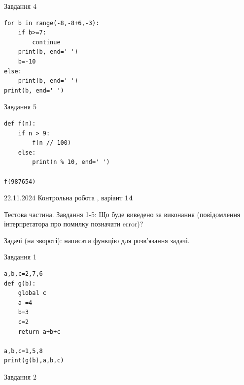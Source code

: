 \documentclass[12pt, ukrainian]{article}
\begin{document}
{{{{{{{{{{{{{\begin{minipage}[t]{10.7cm}
{\begin{center}Завдання {4}\end{center}}
\vspace{-6mm}

\begin{verbatim}
for b in range(-8,-8+6,-3):
    if b>=7:
        continue
    print(b, end=' ')
    b=-10
else:
    print(b, end=' ')
print(b, end=' ')
\end{verbatim}


\vspace{5mm}
               
{\begin{center}Завдання {5}\end{center}}
\vspace{-6mm}

\begin{verbatim}
def f(n):
    if n > 9:
        f(n // 100)
    else:
        print(n % 10, end=' ')

f(987654)
\end{verbatim}


\end{minipage}

\newpage

{{22.11.2024 Контрольна робота , варіант  \No \textbf { 14 }\par}}
{

Тестова частина. Завдання 1-5: Що буде виведено за виконання (повідомлення інтерпретатора про помилку позначати error)?

Задачі (на звороті): написати функцію для розв'язання задачі.

\vspace{5mm} \begin{minipage}[t]{8.5cm}
               
{\begin{center}Завдання {1}\end{center}}
\vspace{-6mm}

\begin{verbatim}
a,b,c=2,7,6
def g(b):
    global c
    a-=4
    b=3
    c=2
    return a+b+c

a,b,c=1,5,8
print(g(b),a,b,c)
\end{verbatim}


\vspace{5mm}
               
{\begin{center}Завдання {2}\end{center}}
\vspace{-6mm}


\end{minipage}}}}}}}}}}}}}}}
\end{document}

